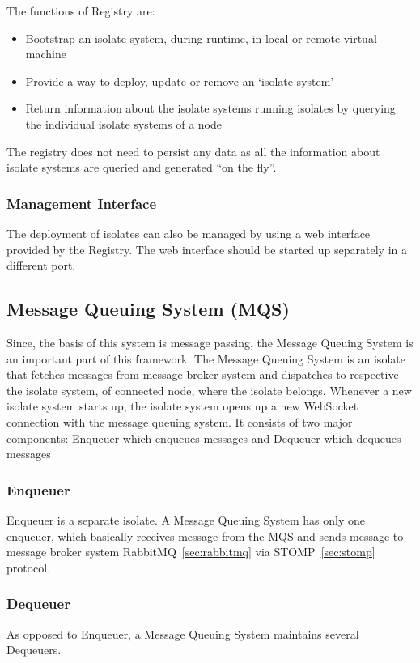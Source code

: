 The functions of Registry are:
\begin{itemize}
  \item Bootstrap an isolate system, during runtime, in local or remote virtual machine
  \item Provide a way to deploy, update or remove an ‘isolate system’
  \item Return information about the isolate systems running isolates by querying the individual isolate systems of a node
\end{itemize}

The registry does not need to persist any data as all the information about isolate systems are queried and generated “on the fly”.

  \subsubsection{Management Interface}
  The deployment of isolates can also be managed by using a web interface provided by the Registry. The web interface should be started up separately in a different port.

\subsection{Message Queuing System (MQS)}
Since, the basis of this system is message passing, the Message Queuing System is an important part of this framework. The Message Queuing System is an isolate that fetches messages from message broker system and dispatches to respective the isolate system, of connected node, where the isolate belongs. Whenever a new isolate system starts up, the isolate system opens up a new WebSocket connection with the message queuing system.
It consists of two major components: Enqueuer \textendash{} which enqueues messages and Dequeuer \textendash{} which dequeues messages
  \subsubsection{Enqueuer}
  Enqueuer is a separate isolate. A Message Queuing System has only one enqueuer, which basically receives message from the MQS and sends message to message broker system \textendash{} RabbitMQ~\ref{sec:rabbitmq} via STOMP~\ref{sec:stomp} protocol.

  \subsubsection{Dequeuer}
  As opposed to Enqueuer, a Message Queuing System maintains several Dequeuers.

